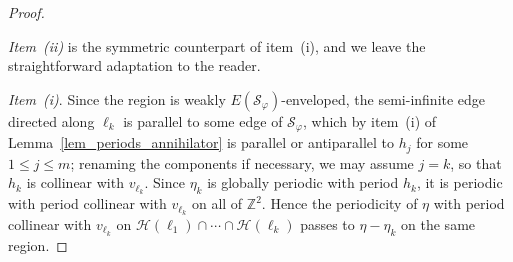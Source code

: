 \documentclass[12pt]{amsart}
\numberwithin{equation}{section}
\begin{document}
\begin{proof} \

\textit{Item~(ii)} is the symmetric counterpart of
item~(i), and we leave the straightforward adaptation to the reader.

\smallskip

\textit{Item~(i)}. Since the region is weakly $E(\mathcal S_\varphi)$-enveloped, the semi-infinite edge directed along $\pmb{\ell}_k$ is parallel to some edge of $ \mathcal S_\varphi $, which by item~(i) of Lemma~\ref{lem_periods_annihilator} is parallel or antiparallel to $h_j$ for some $ 1\le j \le m$; renaming the components if necessary, we may assume $j=k$, so that $ h_k $ is collinear with $v_{\pmb{\ell}_k}$. Since $\eta_k$ is globally periodic with period $ h_k $, it is periodic with period collinear with $v_{\pmb{\ell}_k}$ on all of $\mathbb Z^2$. Hence the periodicity of $ \eta $ with period collinear with $v_{\pmb{\ell}_k}$ on $\mathcal H(\pmb{\ell}_1)\cap \cdots \cap \mathcal{H}(\pmb{\ell}_{k})$ passes to $ \eta - \eta_k $ on the same region. 


\end{proof}
\end{document}
